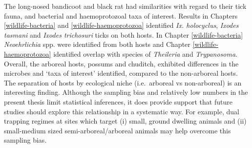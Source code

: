 \documentclass[a4paper, nobind]{templates/ociamthesis}
\begin{document}
The long-nosed bandicoot and black rat had similarities with regard to their tick fauna, and bacterial and haemoprotozoal taxa of interest.
Results in Chapters \ref{wildlife-bacteria} and \ref{wildlife-haemoprotozoa} identified \emph{Ix. holocyclus}, \emph{Ixodes tasmani} and \emph{Ixodes trichosuri} ticks on both hosts.
In Chapter \ref{wildlife-bacteria} \emph{Neoehrlichia} spp. were identified from both hosts and Chapter \ref{wildlife-haemoprotozoa} identified overlap with species of \emph{Theileria} and \emph{Trypanosoma}.
Overall, the arboreal hosts, possums and chuditch, exhibited differences in the microbes and `taxa of interest' identified, compared to the non-arboreal hosts.
The separation of hosts by ecological niche (i.e.~arboreal vs non-arboreal) is an interesting finding.
Although the sampling bias and relatively low numbers in the present thesis limit statistical inferences, it does provide support that future studies should explore this relationship in a systematic way.
For example, dual trapping regimes at sites which target (i) small, ground dwelling animals and (ii) small-medium sized semi-arboreal/arboreal animals may help overcome this sampling bias.
\end{document}
